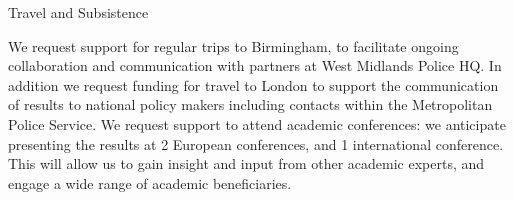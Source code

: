 Travel and Subsistence

We request support for regular trips to Birmingham, to facilitate ongoing collaboration and communication with partners at West Midlands Police HQ. In addition we request funding for travel to London to support the communication of results to national policy makers including contacts within the Metropolitan Police Service. We request support to attend academic conferences: we anticipate presenting the results at 2 European conferences, and 1 international conference. This will allow us to gain insight and input from other academic experts, and engage a wide range of academic beneficiaries.






